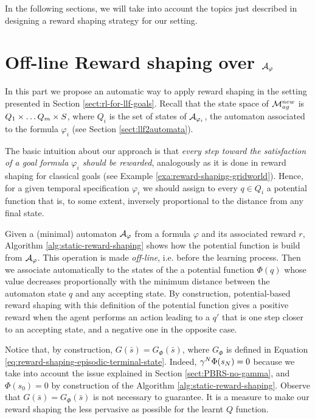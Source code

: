 \medskip
In the following sections, we will take into account the topics just described in designing a reward shaping strategy for our setting.

\section{Off-line Reward shaping over $\mathcal{A}_\varphi$}\label{sect:off-line-reward-shaping}
In this part we propose an automatic way to apply reward shaping in the setting presented in Section \ref{sect:rl-for-llf-goals}.
Recall that the state space of $\mathcal{M}_{ag}^{new}$ is $Q_1\times \dots Q_m \times S$, where $Q_i$ is the set of states of $\mathcal{A}_{\varphi_i}$, the automaton associated to the \LLf formula $\varphi_i$ (see Section \ref{sect:llf2automata}).

The basic intuition about our approach is that \emph{every step toward the satisfaction of a goal formula $\varphi_i$ should be rewarded}, analogously as it is done in reward shaping for classical goals (see Example \ref{exa:reward-shaping-gridworld}). Hence, for a given temporal specification $\varphi_i$ we should assign to every $q\in Q_i$ a potential function that is, to some extent, inversely proportional to the distance from any final state.

Given a (minimal) automaton $\mathcal{A}_{\varphi}$ from a \LLf formula $\varphi$ and its associated reward $r$, Algorithm \ref{alg:static-reward-shaping} shows how the potential function is build from $\mathcal{A}_{\varphi}$. This operation is made \emph{off-line}, i.e. before the learning process. Then we associate automatically to the states of the \DFA a potential function $\Phi(q)$ whose value decreases proportionally with the minimum distance between the automaton state $q$ and any accepting state. By construction, potential-based reward shaping with this definition of the potential function gives a positive reward when the agent performs an action leading to a $q'$ that is one step closer to an accepting state, and a negative one in the opposite case.
 
Notice that, by construction, $G(\bar{s}) = G_\Phi(\bar{s})$, where $G_\Phi$ is defined in Equation \ref{eq:reward-shaping-episodic-terminal-state}. Indeed, $\gamma^N\Phi(s_N) = 0$ because we take into account the issue explained in Section \ref{sect:PBRS-no-gamma}, and $\Phi(s_0) = 0$ by construction of the Algorithm \ref{alg:static-reward-shaping}. Observe that $G(\bar{s}) = G_\Phi(\bar{s})$ is not necessary to guarantee. It is a measure to make our reward shaping the less pervasive as possible for the learnt $Q$ function.

